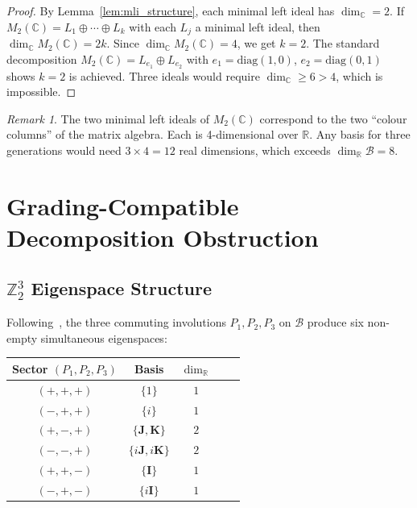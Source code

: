 \documentclass[12pt,a4paper]{article}
\theoremstyle{remark}
\newtheorem{remark}[theorem]{Remark}
\begin{document}
\begin{proof}
  By Lemma~\ref{lem:mli_structure}, each minimal left ideal has
  $\dim_\mathbb{C} = 2$.  If $M_2(\mathbb{C}) = L_1 \oplus \cdots \oplus L_k$
  with each $L_j$ a minimal left ideal, then $\dim_\mathbb{C} M_2(\mathbb{C})
  = 2k$.  Since $\dim_\mathbb{C} M_2(\mathbb{C}) = 4$, we get $k = 2$.
  The standard decomposition $M_2(\mathbb{C}) = L_{e_1} \oplus L_{e_2}$
  with $e_1 = \mathrm{diag}(1,0)$, $e_2 = \mathrm{diag}(0,1)$ shows $k=2$
  is achieved.  Three ideals would require $\dim_\mathbb{C} \geq 6 > 4$,
  which is impossible.
\end{proof}

\begin{remark}
  The two minimal left ideals of $M_2(\mathbb{C})$ correspond to the two
  ``colour columns'' of the matrix algebra.  Each is 4-dimensional over $\mathbb{R}$.
  Any basis for three generations would need $3 \times 4 = 12$ real dimensions,
  which exceeds $\dim_\mathbb{R} \mathcal{B} = 8$.
\end{remark}

\section{Grading-Compatible Decomposition Obstruction}
\label{sec:grading}

\subsection{$\mathbb{Z}_2^3$ Eigenspace Structure}

Following~\cite{su3triplet}, the three commuting involutions $P_1, P_2, P_3$
on $\mathcal{B}$ produce six non-empty simultaneous eigenspaces:

\begin{center}
\begin{tabular}{ccccc}
  \hline
  Sector $(P_1,P_2,P_3)$ & Basis & $\dim_\mathbb{R}$ \\
  \hline
  $(+{,}+{,}+)$ & $\{1\}$ & $1$ \\
  $(-{,}+{,}+)$ & $\{i\}$ & $1$ \\
  $(+{,}-{,}+)$ & $\{\mathbf{J},\mathbf{K}\}$ & $2$ \\
  $(-{,}-{,}+)$ & $\{i\mathbf{J},i\mathbf{K}\}$ & $2$ \\
  $(+{,}+{,}-)$ & $\{\mathbf{I}\}$ & $1$ \\
  $(-{,}+{,}-)$ & $\{i\mathbf{I}\}$ & $1$ \\
  \hline
\end{tabular}
\end{center}
\end{document}
